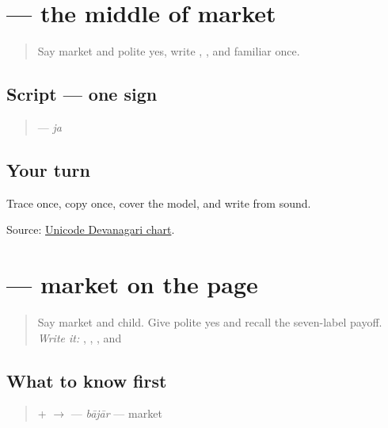 \section[\texorpdfstring{\mw{ज} (ja)}{ज (ja)}]{ — the middle of market}

\label{lesson:MW-W10-ja}



\begin{quote}
Say market and polite yes, write \textbf{}, \textbf{}, and familiar \textbf{} once.
\end{quote}

\subsection*{Script — one sign}

\begin{quote}
\textbf{} — \emph{ja}
\end{quote}

\subsection*{Your turn}
Trace once, copy once, cover the model, and write \textbf{} from sound.

\begin{tcolorbox}[breakable,colback=teal!4,colframe=teal!35!black,title={Before you move on}]
Source: \href{https://www.unicode.org/charts/PDF/U0900.pdf}{Unicode Devanagari chart}.
\end{tcolorbox}
\section[\texorpdfstring{\mw{बाजार} (bājār)}{बाजार (bājār)}]{ — market on the page}

\label{lesson:MW-C10-bajar}



\begin{quote}
Say market and child. Give polite yes and recall the seven-label payoff. \emph{Write it:} \textbf{}, \textbf{}, \textbf{}, and \textbf{}
\end{quote}

\subsection*{What to know first}
\begin{quote}
\textbf{} + \textbf{} $\to$ \textbf{} — \emph{bājār} — market
\end{quote}

